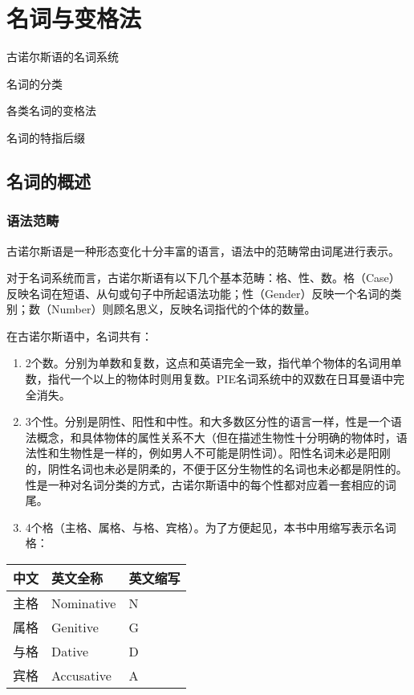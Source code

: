 \chapter{名词与变格法}
\label{名词与变格法}

\begin{introduction}[章节要点]
  \item 古诺尔斯语的名词系统
  \item 名词的分类
  \item 各类名词的变格法
  \item 名词的特指后缀
\end{introduction}

\section{名词的概述}
\label{名词的概述}
\subsection{语法范畴}
古诺尔斯语是一种形态变化十分丰富的语言，语法中的范畴常由词尾进行表示。

对于名词系统而言，古诺尔斯语有以下几个基本范畴：格、性、数。格（Case）反映名词在短语、从句或句子中所起语法功能；性（Gender）反映一个名词的类别；数（Number）则顾名思义，反映名词指代的个体的数量。

在古诺尔斯语中，名词共有：

\begin{enumerate}

  \item
        2个数。分别为单数和复数，这点和英语完全一致，指代单个物体的名词用单数，指代一个以上的物体时则用复数。PIE名词系统中的双数在日耳曼语中完全消失。
  \item
        3个性。分别是阴性、阳性和中性。和大多数区分性的语言一样，性是一个语法概念，和具体物体的属性关系不大（但在描述生物性十分明确的物体时，语法性和生物性是一样的，例如男人不可能是阴性词）。阳性名词未必是阳刚的，阴性名词也未必是阴柔的，不便于区分生物性的名词也未必都是阴性的。性是一种对名词分类的方式，古诺尔斯语中的每个性都对应着一套相应的词尾。
  \item
        4个格（主格、属格、与格、宾格）。为了方便起见，本书中用缩写表示名词格：
\end{enumerate}

\begin{longtable}{lll}
  \toprule
  \textbf{中文} & \textbf{英文全称} & \textbf{英文缩写} \\
  \midrule
  \endhead
  \bottomrule
  \endfoot
  主格          & Nominative    & N             \\
  属格          & Genitive      & G             \\
  与格          & Dative        & D             \\
  宾格          & Accusative    & A             \\
\end{longtable}

